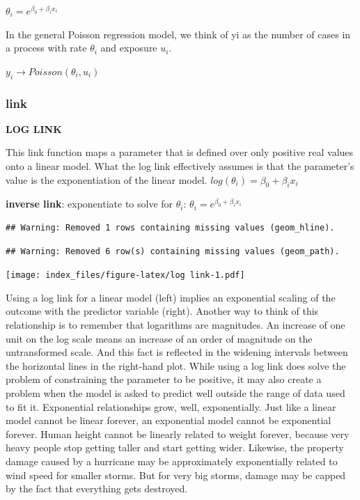 \documentclass[
]{article}
\begin{document}
\(\theta_i=e^{\beta_0 +\beta_ix_i}\)

In the general Poisson regression model, we think of yi as the number of
cases in a process with rate \(\theta_i\) and exposure \(u_i\).

\(y_i \to Poisson(\theta_i, u_i)\)

\hypertarget{link-2}{%
\subsubsection{link}\label{link-2}}

\textbf{LOG LINK}

This link function maps a parameter that is defined over only positive
real values onto a linear model. What the log link effectively assumes
is that the parameter's value is the exponentiation of the linear model.
\(log(\theta_i)= \beta_0 +\beta_ix_i\)

\textbf{inverse link}: exponentiate to solve for \(\theta_i\):
\(\theta_i=e^{\beta_0 +\beta_ix_i}\)

\begin{verbatim}
## Warning: Removed 1 rows containing missing values (geom_hline).
\end{verbatim}

\begin{verbatim}
## Warning: Removed 6 row(s) containing missing values (geom_path).
\end{verbatim}

\texttt{[image: index\_files/figure-latex/log link-1.pdf]}

Using a log link for a linear model (left) implies an exponential
scaling of the outcome with the predictor variable (right). Another way
to think of this relationship is to remember that logarithms are
magnitudes. An increase of one unit on the log scale means an increase
of an order of magnitude on the untransformed scale. And this fact is
reflected in the widening intervals between the horizontal lines in the
right-hand plot. While using a log link does solve the problem of
constraining the parameter to be positive, it may also create a problem
when the model is asked to predict well outside the range of data used
to fit it. Exponential relationships grow, well, exponentially. Just
like a linear model cannot be linear forever, an exponential model
cannot be exponential forever. Human height cannot be linearly related
to weight forever, because very heavy people stop getting taller and
start getting wider. Likewise, the property damage caused by a hurricane
may be approximately exponentially related to wind speed for smaller
storms. But for very big storms, damage may be capped by the fact that
everything gets destroyed.
\end{document}
